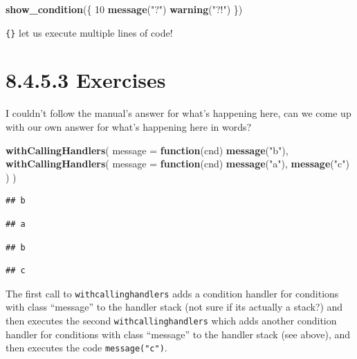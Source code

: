 \documentclass[]{book}
\newenvironment{Shaded}{\begin{snugshade}}{\end{snugshade}}
\newcommand{\ControlFlowTok}[1]{\textcolor[rgb]{0.13,0.29,0.53}{\textbf{#1}}}
\newcommand{\DataTypeTok}[1]{\textcolor[rgb]{0.13,0.29,0.53}{#1}}
\newcommand{\DecValTok}[1]{\textcolor[rgb]{0.00,0.00,0.81}{#1}}
\newcommand{\KeywordTok}[1]{\textcolor[rgb]{0.13,0.29,0.53}{\textbf{#1}}}
\newcommand{\NormalTok}[1]{#1}
\newcommand{\StringTok}[1]{\textcolor[rgb]{0.31,0.60,0.02}{#1}}
\begin{document}
\begin{Shaded}
\begin{Highlighting}[]
\KeywordTok{show_condition}\NormalTok{(\{}
  \DecValTok{10}
  \KeywordTok{message}\NormalTok{(}\StringTok{"?"}\NormalTok{)}
  \KeywordTok{warning}\NormalTok{(}\StringTok{"?!"}\NormalTok{)}
\NormalTok{\})}
\end{Highlighting}
\end{Shaded}

\texttt{\{\}} let us execute multiple lines of code!

\hypertarget{exercises-5}{%
\section*{8.4.5.3 Exercises}\label{exercises-5}}

I couldn't follow the manual's answer for what's happening here, can we come up with our own answer for what's happening here in words?

\begin{Shaded}
\begin{Highlighting}[]
\KeywordTok{withCallingHandlers}\NormalTok{(}
  \DataTypeTok{message =} \ControlFlowTok{function}\NormalTok{(cnd) }\KeywordTok{message}\NormalTok{(}\StringTok{"b"}\NormalTok{),}
  \KeywordTok{withCallingHandlers}\NormalTok{(}
    \DataTypeTok{message =} \ControlFlowTok{function}\NormalTok{(cnd) }\KeywordTok{message}\NormalTok{(}\StringTok{"a"}\NormalTok{),}
    \KeywordTok{message}\NormalTok{(}\StringTok{"c"}\NormalTok{)}
\NormalTok{  )}
\NormalTok{)}
\end{Highlighting}
\end{Shaded}

\begin{verbatim}
## b
\end{verbatim}

\begin{verbatim}
## a
\end{verbatim}

\begin{verbatim}
## b
\end{verbatim}

\begin{verbatim}
## c
\end{verbatim}

The first call to \texttt{withcallinghandlers} adds a condition handler for conditions with class ``message'' to the handler stack (not sure if its actually a stack?) and then executes the second \texttt{withcallinghandlers} which adds another condition handler for conditions with class ``message'' to the handler stack (see above), and then executes the code \texttt{message("c")}.
\end{document}

